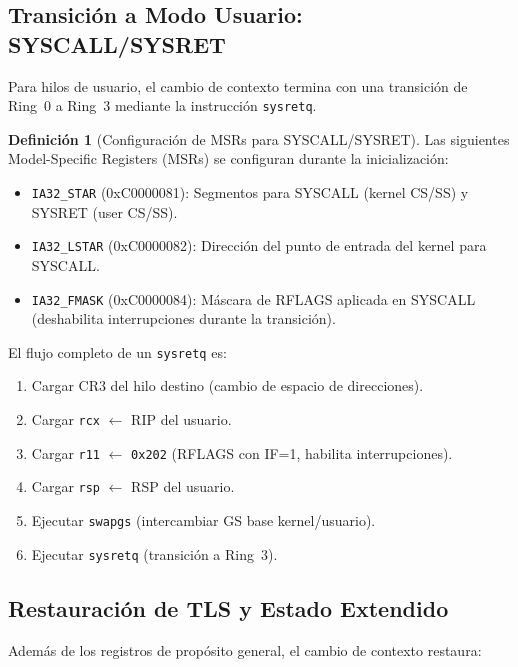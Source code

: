 \documentclass[11pt,twoside,openright]{book}
\theoremstyle{definition}
\newtheorem{definition}{Definición}[chapter]
\theoremstyle{plain}
\theoremstyle{remark}
\begin{document}
\subsection{Transición a Modo Usuario: SYSCALL/SYSRET}

Para hilos de usuario, el cambio de contexto termina con una transición de Ring~0 a Ring~3
mediante la instrucción \texttt{sysretq}.

\begin{definition}[Configuración de MSRs para SYSCALL/SYSRET]
\label{def:syscall-msr}
Las siguientes Model-Specific Registers (MSRs) se configuran durante la inicialización:
\begin{itemize}
    \item \texttt{IA32\_STAR} (0xC0000081): Segmentos para SYSCALL (kernel CS/SS) y
          SYSRET (user CS/SS).
    \item \texttt{IA32\_LSTAR} (0xC0000082): Dirección del punto de entrada del kernel
          para SYSCALL.
    \item \texttt{IA32\_FMASK} (0xC0000084): Máscara de RFLAGS aplicada en SYSCALL
          (deshabilita interrupciones durante la transición).
\end{itemize}
\end{definition}

El flujo completo de un \texttt{sysretq} es:

\begin{enumerate}
    \item Cargar CR3 del hilo destino (cambio de espacio de direcciones).
    \item Cargar \texttt{rcx} $\gets$ RIP del usuario.
    \item Cargar \texttt{r11} $\gets$ \texttt{0x202} (RFLAGS con IF=1, habilita interrupciones).
    \item Cargar \texttt{rsp} $\gets$ RSP del usuario.
    \item Ejecutar \texttt{swapgs} (intercambiar GS base kernel/usuario).
    \item Ejecutar \texttt{sysretq} (transición a Ring~3).
\end{enumerate}

\subsection{Restauración de TLS y Estado Extendido}

Además de los registros de propósito general, el cambio de contexto restaura:
\end{document}
